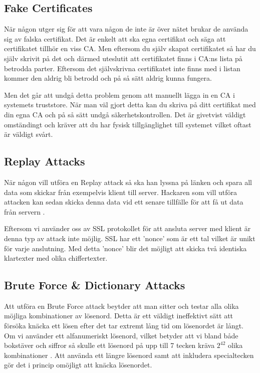 \subsection{Fake Certificates}

När någon utger sig för att vara någon de inte är över nätet brukar de använda sig av falska certifikat. Det är enkelt att ska egna certifikat och säga att certifikatet tillhör en viss CA. Men eftersom du själv skapat certifikatet så har du själv skrivit på det och därmed uteslutit att certifikatet finns i CA:ns lista på betrodda parter. Eftersom det självskrivna certifikatet inte finns med i listan kommer den aldrig bli betrodd och på så sätt aldrig kunna fungera.

Men det går att undgå detta problem genom att manuellt lägga in en CA i systemets truststore. När man väl gjort detta kan du skriva på ditt certifikat med din egna CA och på så sätt undgå säkerhetskontrollen. Det är givetvist väldigt omständingt och kräver att du har fysisk tillgänglighet till systemet vilket oftast är väldigt svårt. 

\subsection{Replay Attacks}


När någon vill utföra en Replay attack så ska han lyssna på länken och spara all data som skickar från exempelvis klient till server. Hackaren som vill utföra attacken kan sedan skicka denna data vid ett senare tillfälle för att få ut data från servern \cite{Replay}.

Eftersom vi använder oss av SSL protokollet för att ansluta server med klient är denna typ av attack inte möjlig. SSL har ett 'nonce' som är ett tal vilket är unikt för varje anslutning. Med detta 'nonce' blir det möjligt att skicka två identiska klartexter med olika chiffertexter. 

\subsection{Brute Force \& Dictionary Attacks}

Att utföra en Brute Force attack beytder att man sitter och testar alla olika möjliga kombinationer av lösenord. Detta är ett väldigt ineffektivt sätt att försöka knäcka ett lösen efter det tar extremt lång tid om lösenordet är långt. Om vi använder ett alfanumeriskt lösenord, vilket betyder att vi bland både bokstäver och siffror så skulle ett lösenord på upp till 7 tecken kräva \begin{math}2^{42} \end{math} olika kombinationer \cite{F4}. Att använda ett längre lösenord samt att inkludera specialtecken gör det i princip omöjligt att knäcka lösenordet.

